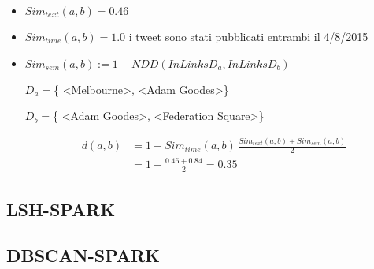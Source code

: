 \begin{itemize}
\item $Sim_{text}(a,b)=0.46$ 
\item $Sim_{time}(a,b)=1.0$ i tweet sono stati pubblicati entrambi il 4/8/2015
\item $Sim_{sem}(a,b):=1-NDD(InLinks{D_a},InLinks{D_b}) $


  $D_a=$\{ \textless\href{http://dbpedia.org/resource/Melbourne}{Melbourne}\textgreater, \textless\href{http://dbpedia.org/resource/Adam_Goodes}{Adam Goodes}\textgreater\}
  
  $D_b=$\{ \textless\href{http://dbpedia.org/resource/Adam_Goodes}{Adam Goodes}\textgreater, \textless\href{http://dbpedia.org/resource/Federation_Square}{Federation Square}\textgreater\}
 
 \begin{align*}
d(a,b)&=1- Sim_{time}(a,b)\,\frac{Sim_{text}(a,b)+Sim_{sem}(a,b)}{2}\\
&=1-\frac{0.46+0.84}{2}=0.35
\end{align*}
  
\end{itemize}

\subsection{LSH-SPARK}
\subsection{DBSCAN-SPARK}

